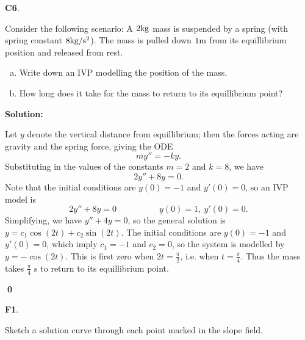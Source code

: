 \documentclass{article}
\newenvironment{problem}[1]
{
  \begin{flushleft}
  \textbf{#1}.
  \ignorespaces
}
{
  \end{flushleft}
}
\newenvironment{solution}
{
  \ignorespaces
  \textbf{Solution:}
}
{
  \ignorespacesafterend
  \begin{flushright}
  {\bfseries \qed}
  \end{flushright}
}
\begin{document}
\begin{problem}{C6}
Consider the following scenario:
A \(2 {\rm kg}\) mass is suspended by a spring (with spring constant \(8 {\rm kg /s^2}\)).  The mass is pulled down \(1 {\rm m}\) from its equillibrium position and released from rest.  
\begin{enumerate}[(a)]
\item Write down an IVP modelling the position of the mass.
\item How long does it take for the mass to return to its equillibrium point?
\end{enumerate}
\end{problem}
\begin{solution}
Let \(y\) denote the vertical distance from equillibrium; then the forces acting are gravity and the spring force, giving the ODE
\[my''=-ky.\]
Substituting in the values of the constants \(m=2\) and \(k=8\), we have
\[ 2y''+8y=0 .\]
Note that the initial conditions are \(y(0)=-1\) and \(y'(0)=0\), so an IVP model is 
\[ 2y''+8y=0 \hspace{5em} y(0)=1,\ y'(0)=0.\]
Simplifying, we have \(y''+4y=0\), so the general solution is \(y=c_1 \cos(2t)+c_2\sin(2t)\).  The initial conditions are \(y(0)=-1\) and \(y'(0)=0\), which imply \(c_1=-1\) and \(c_2=0\), so the system is modelled by \(y=-\cos(2t)\).  This is first zero when \(2t=\frac{\pi}{2}\), i.e. when \(t=\frac{\pi}{4}\).  Thus the mass takes \(\frac{\pi}{4}\) {\rm s} to return to its equillibrium point.
\end{solution}




\begin{problem}{F1}
Sketch a solution curve through each point marked in the slope field.

\begin{center}\end{center}
\end{problem}
\end{document}
